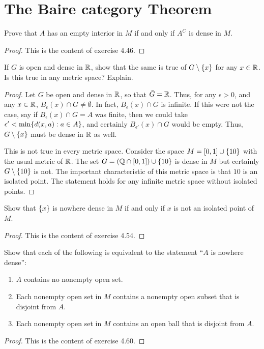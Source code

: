 \section{The Baire category Theorem}


\begin{exercise}{14}
Prove that $A$ has an empty interior in $M$ if and only if $A^C$ is dense in $M$.
\end{exercise}
\begin{proof}
This is the content of exercise 4.46.
\end{proof} 

\begin{exercise}{15}
If $G$ is open and dense in $\mathbb{R}$, show that the same is true of $G\setminus\{x\}$ for any $x\in\mathbb{R}$. 
Is this true in any metric space?
Explain.
\end{exercise}
\begin{proof}
Let $G$ be open and dense in $\mathbb{R}$, so that $\bar{G}=\mathbb{R}$.
Thus, for any $\epsilon>0$, and any $x\in\mathbb{R}$, $B_\epsilon(x)\cap G\neq \emptyset$.
In fact, $B_\epsilon(x)\cap G$ is infinite.
If this were not the case, say if $B_\epsilon(x)\cap G = A$ was finite, then we could take $\epsilon' < \min\{d(x,a): a\in A\}$, and certainly $B_{\epsilon'}(x)\cap G$ would be empty. 
Thus, $G\setminus\{x\}$ must be dense in $\mathbb{R}$ as well.

This is not true in every metric space.
Consider the space $M=[0,1]\cup \{10\}$ with the usual metric of $\mathbb{R}$.
The set $G = (\mathbb{Q}\cap[0,1]) \cup \{10\}$ is dense in $M$ but certainly $G\setminus\{10\}$ is not.
The important characteristic of this metric space is that $10$ is an isolated point.
The statement holds for any infinite metric space without isolated points.
\end{proof} 

\begin{exercise}{16}
Show that $\{x\}$ is nowhere dense in $M$ if and only if $x$ is not an isolated point of $M$.
\end{exercise}
\begin{proof}
This is the content of exercise 4.54.
\end{proof} 

\begin{exercise}{19}
Show that each of the following is equivalent to the statement ``$A$ is nowhere dense'':
\begin{enumerate}
    \item $\bar{A}$ contains no nonempty open set.
    \item Each nonempty open set in $M$ contains a nonempty open subset that is disjoint from $A$.
    \item Each nonempty open set in $M$ contains an open ball that is disjoint from $A$.
\end{enumerate}
\end{exercise}
\begin{proof}
This is the content of exercise 4.60.
\end{proof} 

